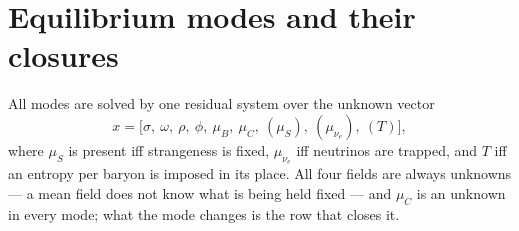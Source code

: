 \documentclass[aps,prc,onecolumn,superscriptaddress,nofootinbib,10pt]{revtex4-2}
\newcommand{\muB}{\mu_B}
\newcommand{\muC}{\mu_C}
\newcommand{\muS}{\mu_S}
\newcommand{\munue}{\mu_{\nu_e}}
\begin{document}
\section{Equilibrium modes and their closures}
\label{sec:modes}

All modes are solved by one residual system over the unknown vector
%
\begin{equation}
x = \big[ \sigma,\ \omega,\ \rho,\ \phi,\ \muB,\ \muC,\
          (\muS),\ (\munue),\ (T) \big] ,
\label{eq:unknowns}
\end{equation}
%
where $\muS$ is present iff strangeness is fixed, $\munue$ iff neutrinos are
trapped, and $T$ iff an entropy per baryon is imposed in its place. All four
fields are always unknowns --- a mean field does not know what is being held
fixed --- and $\muC$ is an unknown in every mode; what the mode changes is the
row that closes it.
\end{document}
